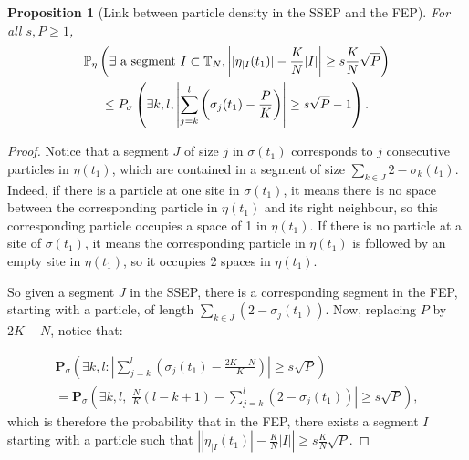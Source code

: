 \documentclass[11pt,a4paper]{article}
\newcommand{\T}{\mathbb{T}}
\newcommand{\PP}{\mathbb{P}}
\newcommand{\bP}{\textbf{P}}
\newtheorem{proposition}[theorem]{Proposition}
\begin{document}
\begin{proposition}[Link between particle density in the SSEP and the FEP] \label{prop:link_fep_ssep}
For all $s, P \ge 1$,
\begin{multline}
\PP_\eta\left(\exists \hbox{ a segment } I \subset \T_N,  \left||\eta_{|I}(t_1) | - \frac{K}{N} |I|\right| \ge s \frac{K}{N} \sqrt{P}\right) \\ \le \textnormal{\bP}_\sigma\left(\exists k,l, \left|\sum_{j=k}^{l} \left(\sigma_j(t_1) - \frac{P}{K} \right) \right|\ge s\sqrt{P} -1\right).
\end{multline}
\end{proposition}
\begin{proof}
Notice that a segment $J$ of size $j$ in $\sigma(t_1)$ corresponds to $j$ consecutive particles in $\eta(t_1)$, which are contained in a segment of size $\sum_{k\in J} 2 - \sigma_k(t_1)$. Indeed, if there is a particle at one site in $\sigma(t_1)$, it means there is no space between the corresponding particle in $\eta(t_1)$ and its right neighbour, so this corresponding particle occupies a space of 1 in $\eta(t_1)$. If there is no particle at a site of $\sigma(t_1)$, it means the corresponding particle in $\eta(t_1)$ is followed by an empty site in $\eta(t_1)$, so it occupies 2 spaces in $\eta(t_1)$. 

So given a segment $J$ in the SSEP, there is a corresponding segment in the FEP, starting with a particle, of length $\sum_{k\in J} \left(2-\sigma_j(t_1)  \right)$. Now, replacing $P$ by $2K-N$, notice that:

\begin{multline}\bP_\sigma\left(\exists k, l : \left|\sum_{j=k}^{l} \left(\sigma_j(t_1) - \frac{2K-N}{K} \right) \right|\ge s\sqrt{P} \right) \\ = \bP_\sigma\left(\exists k, l, \left| \frac{N}{K}(l-k +1) - \sum_{j=k}^{l} \left(2 - \sigma_j(t_1)\right)\right| \ge s\sqrt{P}\right),
\end{multline}
which is  therefore the probability that in the FEP, there exists a segment $I$ starting with a particle such that $\left| |\eta_{|I}(t_1)| - \frac{K}{N} |I| \right| \ge s\frac{K}{N} \sqrt{P}$. 


\end{proof}
\end{document}
